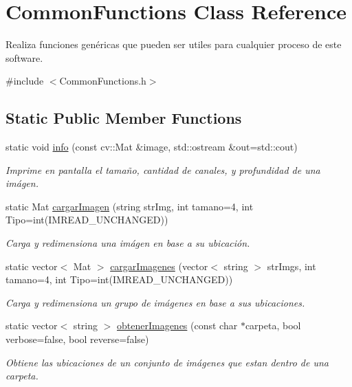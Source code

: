 \hypertarget{classCommonFunctions}{}\section{Common\+Functions Class Reference}
\label{classCommonFunctions}


Realiza funciones genéricas que pueden ser utiles para cualquier proceso de este software.  




{\ttfamily \#include $<$Common\+Functions.\+h$>$}

\subsection*{Static Public Member Functions}
\begin{DoxyCompactItemize}
\item 
static void \mbox{\hyperlink{classCommonFunctions_a51a3e18bdcc2c918ebc81f0cc1f47851}{info}} (const cv\+::\+Mat \&image, std\+::ostream \&out=std\+::cout)
\begin{DoxyCompactList}\small\item\em Imprime en pantalla el tamaño, cantidad de canales, y profundidad de una imágen. \end{DoxyCompactList}\item 
static Mat \mbox{\hyperlink{classCommonFunctions_afd243765a93b61f26d97467a72838ff9}{cargar\+Imagen}} (string str\+Img, int tamano=4, int Tipo=int(I\+M\+R\+E\+A\+D\+\_\+\+U\+N\+C\+H\+A\+N\+G\+ED))
\begin{DoxyCompactList}\small\item\em Carga y redimensiona una imágen en base a su ubicación. \end{DoxyCompactList}\item 
static vector$<$ Mat $>$ \mbox{\hyperlink{classCommonFunctions_a35ffddd0b411b9a87e40743236827569}{cargar\+Imagenes}} (vector$<$ string $>$ str\+Imgs, int tamano=4, int Tipo=int(I\+M\+R\+E\+A\+D\+\_\+\+U\+N\+C\+H\+A\+N\+G\+ED))
\begin{DoxyCompactList}\small\item\em Carga y redimensiona un grupo de imágenes en base a sus ubicaciones. \end{DoxyCompactList}\item 
static vector$<$ string $>$ \mbox{\hyperlink{classCommonFunctions_a1c75d9fe2327ecfa13a4a1078e00c644}{obtener\+Imagenes}} (const char $\ast$carpeta, bool verbose=false, bool reverse=false)
\begin{DoxyCompactList}\small\item\em Obtiene las ubicaciones de un conjunto de imágenes que estan dentro de una carpeta. \end{DoxyCompactList}\item 

\end{DoxyCompactItemize}
